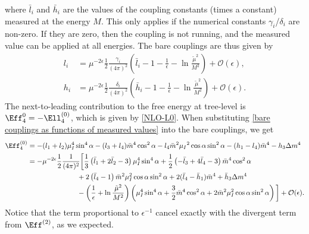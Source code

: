 %
where $\bar l_i$ and $\bar h_i$ are the values of the coupling constants (times a constant) measured at the energy $M$.
This only applies if the numerical constants $\gamma_i$/$\delta_i$ are non-zero.
If they are zero, then the coupling is not running, and the measured value can be applied at all energies.
The bare couplings are thus given by
\begin{align}
    \label{bare couplings as functions of measured values}
    l_i &= \mu^{-2\epsilon} \frac{1}{2} \frac{\gamma_i}{(4 \pi)^2}
    \left(
        \bar l_i -1- \frac{1}{\epsilon} - \ln\frac{\tilde \mu^2}{M^2}
    \right)+ \mathcal{O}(\epsilon), \\
    h_i &= \mu^{-2\epsilon} \frac{1}{2} \frac{\delta_i}{(4 \pi)^2}
    \left(
        \bar h_i - 1 - \frac{1}{\epsilon} - \ln\frac{\tilde \mu^2}{M^2}
    \right)
    + \mathcal{O}(\epsilon).
\end{align}
%
The next-to-leading contribution to the free energy at tree-level is $\Eff_4^{0} = - \Ell_4^{(0)}$, which is given by \autoref{NLO-L0}.
When substituting \autoref{bare couplings as functions of measured values} into the bare couplings, we get
%
\begin{align*}
    \Eff^{(0)}_4
    & = 
    - (l_1 + l_2)\mu_I^4 \sin^4{\alpha}
    - (l_3 + l_4)\bar m^4 \cos^2{\alpha}
    - l_4 \bar m^2 \mu_I{}^2 \cos{\alpha} \sin^2{\alpha}
    -(h_1- l_4) \bar m^4
    - h_3 \Delta m^4
    \\
    & = 
    - \mu^{-2 \epsilon} \frac{1}{2} \frac{1}{(4 \pi)^2}
    \bigg[
        \frac{1}{3}
        \left( 
            \bar l_1 + 2 \bar l_2 - 3
        \right) \mu_I^4 \sin^4 \alpha
        +
        \frac{1}{2}
        \left(
            - \bar l_3 + 4 \bar l_4 - 3
        \right) \bar m^4 \cos^2\alpha
        \\
        & \quad \quad \quad \quad \quad \quad \quad
        + 2 \left(\bar l_4 - 1\right)
        \bar m^2 \mu_I^2 \cos\alpha \sin^2 \alpha
        + 2 (\bar l_4 - \bar h_1) \bar m^4
        + \bar h_3 \Delta m^4
        \\
        & \quad \quad \quad \quad \quad \quad \quad
        - 
        \left(\frac{1}{\epsilon} + \ln \frac{\tilde \mu^2}{M^2}\right) 
        \left(
            \mu_I^4\sin^4\alpha + \frac{3}{2} \bar m^4 \cos^2 \alpha
            + 2 \bar m^2 \mu_I^2 \cos\alpha \sin^2 \alpha
        \right) 
    \bigg] + \mathcal{O}(\epsilon).
\end{align*}
%
Notice that the term proportional to $\epsilon^{-1}$ cancel exactly with the divergent term from $\Eff^{(2)}$, as we expected.
